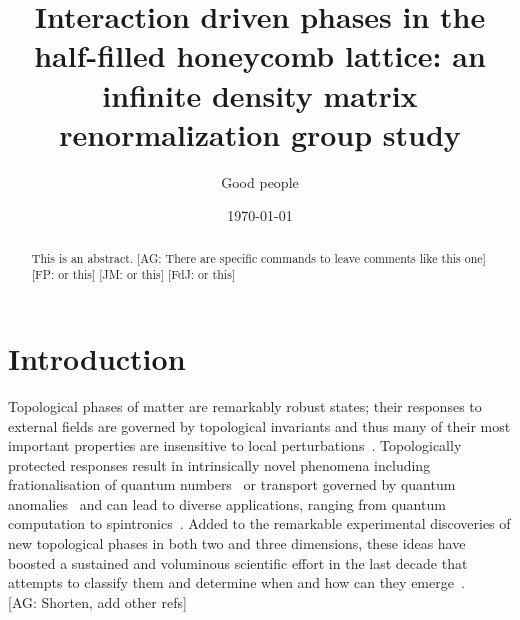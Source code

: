 \documentclass[aps,prx,10pt,twocolumn,floatfix,superscriptaddress,showpacs,numerical,footinbib]{revtex4-1}
\newcommand{\noteAG}[1]{{\color{blue} [AG: #1]}}
\newcommand{\noteFP}[1]{{\color{magenta} [FP: #1]}}
\newcommand{\noteJM}[1]{{\color{red} [JM: #1]}}
\newcommand{\noteFdJ}[1]{{\color{cyan} [FdJ: #1]}}
\begin{document}
%
\title{Interaction driven phases in the half-filled honeycomb lattice: an infinite density matrix renormalization group study}
%
\author{Good people}
%
\date{\today}
%
\begin{abstract}
%
This is an abstract.
%
\noteAG{There are specific commands to leave comments like this one}\noteFP{or this}\noteJM{or this}\noteFdJ{or this}
%
\end{abstract}
%
\maketitle
%

\section{Introduction}
%
Topological phases of matter are remarkably robust states; their responses to external fields are
governed by topological invariants and thus many of their most important properties are insensitive to local perturbations~\cite{HK10,QZ11}.
%
Topologically protected responses result in intrinsically novel phenomena
including frationalisation of quantum numbers~\cite{Nayak2008} or transport governed by quantum anomalies~\cite{V03}
and can lead to diverse applications, ranging from quantum computation to spintronics~\cite{HK10,QZ11,Nayak2008}.
%
Added to the remarkable experimental discoveries of new topological phases in both two and three dimensions,
these ideas have boosted a sustained and voluminous scientific effort in the last decade that attempts to classify them 
and determine when and how can they emerge~\cite{HK10,QZ11}.\\
\noteAG{Shorten, add other refs}
%
\end{document}
